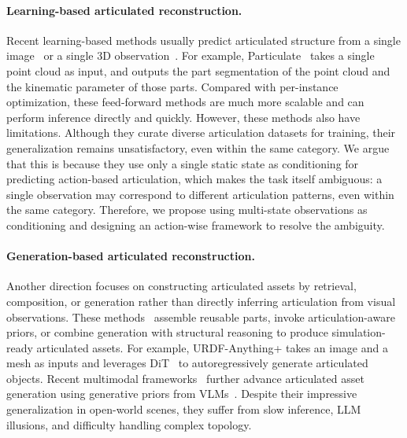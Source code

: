 \paragraph{Learning-based articulated reconstruction.} 
Recent learning-based methods usually predict articulated structure from a single image~\cite{chen2024urdformer,li2026monoart} or a single 3D observation~\cite{che2024op,Goyal_2025_ICCV,li2025particulate,gao2025meshart,song2025magicarticulate,li2025urdfanything}. 
For example, Particulate~\cite{li2025particulate} takes a single point cloud as input, and outputs the part segmentation of the point cloud and the kinematic parameter of those parts. 
Compared with per-instance optimization, these feed-forward methods are much more scalable and can perform inference directly and quickly. 
However, these methods also have limitations.
Although they curate diverse articulation datasets for training, their generalization remains unsatisfactory, even within the same category. 
We argue that this is because they use only a single static state as conditioning for predicting action-based articulation, which makes the task itself ambiguous: a single observation may correspond to different articulation patterns, even within the same category.
Therefore, we propose using multi-state observations as conditioning and designing an action-wise framework to resolve the ambiguity. 

\paragraph{Generation-based articulated reconstruction.} 
Another direction focuses on constructing articulated assets by retrieval, composition, or generation rather than directly inferring articulation from visual observations. 
These methods~\cite{liusingapo,lei2023nap,liu2024cage,chen2025freeart3d,chen2025ArtiLatent,wu2026urdfanything_plus,Su_2025_CVPR} assemble reusable parts, invoke articulation-aware priors, or combine generation with structural reasoning to produce simulation-ready articulated assets. 
For example, URDF-Anything+ takes an image and a mesh as inputs and leverages DiT~\cite{peebles2023scalable,chen2025autopartgen} to autoregressively generate articulated objects.
Recent multimodal frameworks~\cite{wang2025kinematify,qiu2025articulate,lu2025dreamart,wu2025dipo} further advance articulated asset generation using generative priors from VLMs~\cite{hurst2024gpt,gemini_image_pro}. 
Despite their impressive generalization in open-world scenes, they suffer from slow inference, LLM illusions, and difficulty handling complex topology.



